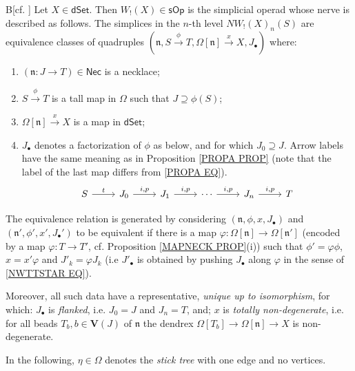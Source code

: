 \documentclass[a4paper,10pt]{article}%
\numberwithin{equation}{section}
\numberwithin{figure}{section}
\theoremstyle{definition} %
\newcommand{\sOp}{\mathsf{sOp}}
\begin{document}
\begin{customthm}{B}[{cf. \cite[Thm. 1.3 and Cor. 4.4]{DS11}}]
	\label{THMB}
	Let $X\in \mathsf{dSet}$.
%
	Then $W_!(X) \in \sOp$ is the simplicial operad whose 
	nerve is described as follows.
%	
	The simplices in the $n$-th level
	$NW_!(X)_{n}(S)$
	are equivalence classes of quadruples
	$(\mathfrak{n}, S \xrightarrow{\phi} T, \Omega[\mathfrak{n}] \xrightarrow{x} X, J_{\bullet})$ 
	where:
\begin{enumerate}[label=(\roman*)]
	\item $(\mathfrak{n}\colon J \to T) \in \mathsf{Nec}$ is a necklace; 
	\item $S \xrightarrow{\phi} T$
		is a tall map in $\Omega$
		such that $J \supseteq \phi(S)$;		
	\item $\Omega[ \mathfrak{n}] \xrightarrow{x} X$ is a map in $\mathsf{dSet}$;
	\item $J_{\bullet}$ denotes a 
		factorization of $\phi$ as below,
		and for which $J_0 \supseteq J$.
		Arrow labels have the same meaning as in 
		Proposition \ref{PROPA PROP}
		(note that the label of the last map differs from
		\eqref{PROPA EQ}).
\begin{equation}
\begin{tikzcd}
	S \ar{r}{t}
&
	J_0 \ar{r}{i,p}
&
	J_1 \ar{r}{i,p}
	&
\cdots
	\ar{r}{i,p}
&
	J_n \ar{r}{i,p}
&
	T
\end{tikzcd}
\end{equation}
\end{enumerate}
	The equivalence relation is generated by considering 
	$(\mathfrak{n},\phi,x,J_{\bullet})$ and
	$(\mathfrak{n}',\phi',x',J_{\bullet}')$
	to be equivalent if there is
	a map
	$\varphi \colon \Omega[\mathfrak{n}] \to \Omega[\mathfrak{n}']$
	(encoded by a map $\varphi \colon T \to T'$,
	 cf. Proposition \ref{MAPNECK PROP}(i))
	such that
	$\phi' = \varphi \phi$,
	$x = x' \varphi $
	and
	$J'_k = \varphi J_k$
	(i.e $J'_{\bullet}$
	is obtained by pushing 
	$J_{\bullet}$ along $\varphi$
	in the sense of \eqref{NWTTSTAR EQ}).
	
	Moreover, all such data have a representative, 
	\emph{unique up to isomorphism},
	for which:
	$J_{\bullet}$ is \emph{flanked},
	i.e. $J_0=J$ and $J_n=T$,
	and;
	$x$ is \emph{totally non-degenerate},
	i.e. for all beads 
	$T_b, b \in \boldsymbol{V}(J)$ of 
	$\mathfrak{n}$
	the dendrex
	$\Omega[T_b] \to \Omega[\mathfrak{n}] \to X$
	is non-degenerate. 
\end{customthm}

In the following, $\eta \in \Omega$
denotes the \emph{stick tree} with one edge and no vertices.
\end{document}
